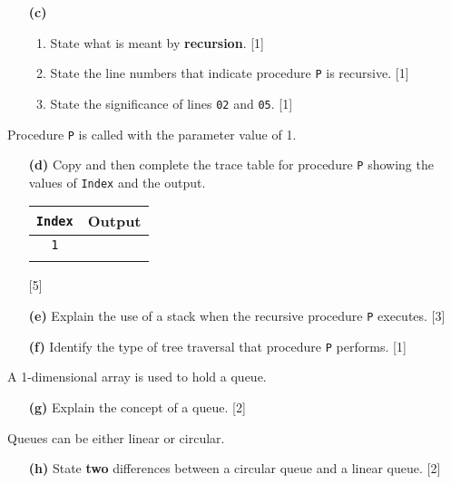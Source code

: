 \begin{enumerate}
\item[\textbf{(c)}] {}
\begin{enumerate}
\item State what is meant by \textbf{recursion}. \hfill{}{[}1{]} 
\item State the line numbers that indicate procedure \texttt{P} is recursive.
\hfill{}{[}1{]} 
\item State the significance of lines \texttt{02} and \texttt{05}. \hfill{}{[}1{]} 
\end{enumerate}
\end{enumerate}
Procedure \texttt{P} is called with the parameter value of 1. 
\begin{enumerate}
\item[\textbf{(d)}] Copy and then complete the trace table for procedure \texttt{P} showing
the values of \texttt{Index} and the output. 
\begin{center}
\begin{tabular}{|c|c|}
\hline 
\texttt{Index} & Output\tabularnewline
\hline 
\hline 
\texttt{1} & \tabularnewline
\hline 
 & \tabularnewline
\end{tabular}
\par\end{center}

\hfill{}{[}5{]}
\item[\textbf{(e)}] Explain the use of a stack when the recursive procedure \texttt{P}
executes. \hfill{}{[}3{]}
\item[\textbf{(f)}] Identify the type of tree traversal that procedure \texttt{P} performs.
\hfill{}{[}1{]}
\end{enumerate}
A 1-dimensional array is used to hold a queue. 
\begin{enumerate}
\item[\textbf{(g)}] Explain the concept of a queue. \hfill{}{[}2{]}
\end{enumerate}
Queues can be either linear or circular. 
\begin{enumerate}
\item[\textbf{(h)}] State \textbf{two} differences between a circular queue and a linear
queue.\hfill{} {[}2{]}
\end{enumerate}